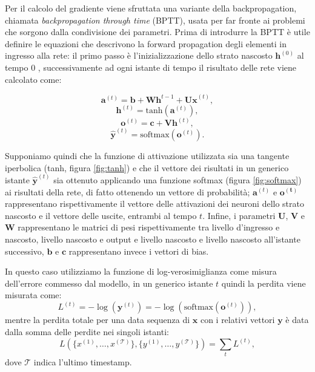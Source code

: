 \documentclass[../../main.tex]{subfiles}
\begin{document}
Per il calcolo del gradiente viene sfruttata una variante della  backpropagation, chiamata \textit{backpropagation through time} (BPTT), usata per far fronte ai problemi che sorgono dalla condivisione dei parametri. Prima di introdurre la BPTT è utile definire le equazioni che descrivono la forward propagation degli elementi in ingresso alla rete: il primo passo è l'inizializzazione dello strato nascosto $\boldsymbol{h}^{(0)}$ al tempo 0 , successivamente ad ogni istante di tempo il risultato delle rete viene calcolato come:
\begin{fleqn}[1cm]
    \begin{equation}
        \boldsymbol{a}^{(t)} = \boldsymbol{b} + \boldsymbol{W h}^{t-1} + \boldsymbol{U x}^{(t)},
    \end{equation}
    \begin{equation}
        \boldsymbol{h}^{(t)} = \mathrm{tanh}(\boldsymbol{a}^{(t)}),
    \end{equation}
    \begin{equation}
        \boldsymbol{o}^{(t)} = \boldsymbol{c} + \boldsymbol{V h}^{(t)},
    \end{equation}
    \begin{equation}
        \boldsymbol{\hat{y}}^{(t)} = \mathrm{softmax}(\boldsymbol{o}^{(t)}).
    \end{equation}
\end{fleqn}
Supponiamo quindi che la funzione di attivazione utilizzata sia una tangente iperbolica (tanh, figura \ref{fig:tanh}) e che il vettore dei risultati in un generico istante $\boldsymbol{\hat{y}}^{(t)}$ sia ottenuto applicando una funzione softmax (figura \ref{fig:softmax}) ai risultati della rete, di fatto ottenendo un vettore di probabilità; $\boldsymbol{a}^{(t)}$ e $\boldsymbol{o^{(t)}}$ rappresentano rispettivamente il vettore delle attivazioni dei neuroni dello strato nascosto e il vettore delle uscite, entrambi al tempo $t$. Infine, i parametri $\boldsymbol{U}$, $\boldsymbol{V}$ e $\boldsymbol{W}$ rappresentano le matrici di pesi rispettivamente tra livello d'ingresso e nascosto, livello nascosto e output e livello nascosto e livello nascosto all'istante successivo, $\boldsymbol{b}$ e $\boldsymbol{c}$ rappresentano invece i vettori di bias.

In questo caso utilizziamo la funzione di log-verosimiglianza come misura dell'errore commesso dal modello, in un generico istante $t$ quindi la perdita viene misurata come:
\[L^{(t)} = -\log(\boldsymbol{y}^{(t)}) = -\log(\mathrm{softmax}(\boldsymbol{o}^{(t)})),\]
mentre la perdita totale per una data sequenza di $\boldsymbol{x}$ con i relativi vettori $\boldsymbol{y}$ è data dalla somma delle perdite nei singoli istanti:
\[L(\{x^{(1)}, \dots, x^{(\mathcal{T})}\}, \{y^{(1)}, \dots, y^{(\mathcal{T})}\}) = \sum_t L^{(t)},\]
dove $\mathcal{T}$ indica l'ultimo timestamp.
\end{document}

